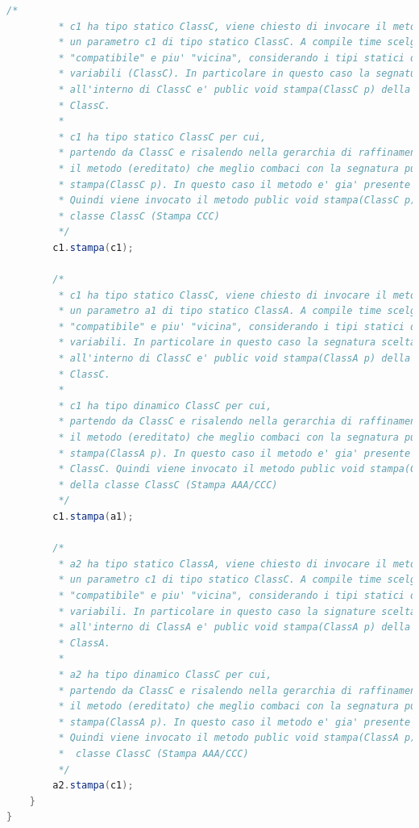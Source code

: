 \documentclass{article}
\begin{document}
\begin{lstlisting}[language=Java,escapechar=|]
		/*
		 * c1 ha tipo statico ClassC, viene chiesto di invocare il metodo stampa su
		 * un parametro c1 di tipo statico ClassC. A compile time scelgo la segnatura
		 * "compatibile" e piu' "vicina", considerando i tipi statici delle
		 * variabili (ClassC). In particolare in questo caso la segnatura scelta
		 * all'interno di ClassC e' public void stampa(ClassC p) della classe
		 * ClassC.
		 * 
		 * c1 ha tipo statico ClassC per cui,
		 * partendo da ClassC e risalendo nella gerarchia di raffinamento, cerco
		 * il metodo (ereditato) che meglio combaci con la segnatura public void 
		 * stampa(ClassC p). In questo caso il metodo e' gia' presente in ClassC. 
		 * Quindi viene invocato il metodo public void stampa(ClassC p) della 
		 * classe ClassC (Stampa CCC)
		 */
		c1.stampa(c1);
		
		/*
		 * c1 ha tipo statico ClassC, viene chiesto di invocare il metodo stampa su
		 * un parametro a1 di tipo statico ClassA. A compile time scelgo la segnatura
		 * "compatibile" e piu' "vicina", considerando i tipi statici delle
		 * variabili. In particolare in questo caso la segnatura scelta
		 * all'interno di ClassC e' public void stampa(ClassA p) della classe
		 * ClassC.
		 * 
		 * c1 ha tipo dinamico ClassC per cui,
		 * partendo da ClassC e risalendo nella gerarchia di raffinamento, cerco
		 * il metodo (ereditato) che meglio combaci con la segnatura public void 
		 * stampa(ClassA p). In questo caso il metodo e' gia' presente in 
		 * ClassC. Quindi viene invocato il metodo public void stampa(ClassA p) 
		 * della classe ClassC (Stampa AAA/CCC)
		 */
		c1.stampa(a1);

		/*
		 * a2 ha tipo statico ClassA, viene chiesto di invocare il metodo stampa su
		 * un parametro c1 di tipo statico ClassC. A compile time scelgo la segnatura
		 * "compatibile" e piu' "vicina", considerando i tipi statici delle
		 * variabili. In particolare in questo caso la signature scelta
		 * all'interno di ClassA e' public void stampa(ClassA p) della classe
		 * ClassA.
		 * 
		 * a2 ha tipo dinamico ClassC per cui,
		 * partendo da ClassC e risalendo nella gerarchia di raffinamento, cerco
		 * il metodo (ereditato) che meglio combaci con la segnatura public void
		 * stampa(ClassA p). In questo caso il metodo e' gia' presente in ClassC. 
		 * Quindi viene invocato il metodo public void stampa(ClassA p) della
		 *  classe ClassC (Stampa AAA/CCC)
		 */
		a2.stampa(c1);
	}
}
\end{lstlisting}
\end{document}
